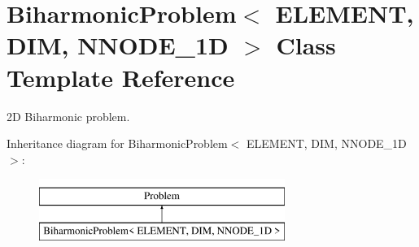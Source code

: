 \hypertarget{classBiharmonicProblem}{}\section{Biharmonic\+Problem$<$ E\+L\+E\+M\+E\+NT, D\+IM, N\+N\+O\+D\+E\+\_\+1D $>$ Class Template Reference}
\label{classBiharmonicProblem}


2D Biharmonic problem.  


Inheritance diagram for Biharmonic\+Problem$<$ E\+L\+E\+M\+E\+NT, D\+IM, N\+N\+O\+D\+E\+\_\+1D $>$\+:\begin{figure}[H]
\begin{center}
\leavevmode
\includegraphics[height=2.000000cm]{classBiharmonicProblem}
\end{center}
\end{figure}
